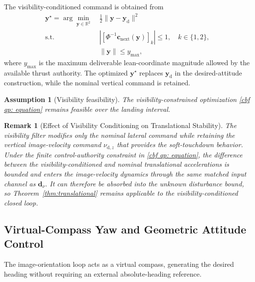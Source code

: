 \documentclass[10pt,conference]{IEEEtran}
\newtheorem{assumption}{Assumption}
\newtheorem{remark}{Remark}
\begin{document}
The visibility-conditioned command is obtained from
\begin{equation}
    \begin{aligned}
    \boldsymbol y^\star = \arg\min_{\boldsymbol y\in\mathbb R^2} ~& \frac{1}{2}\|\boldsymbol y-\boldsymbol y_{\mathrm d}\|^2 \\
    \text{s.t.}\quad& \left| \left[ \Phi^{-1}\boldsymbol c_{\mathrm{next}}(\boldsymbol y) \right]_k \right| \le 1,\quad k\in\{1,2\},\\ 
    &\|\boldsymbol y\|\le y_{\max},
    \end{aligned}
    \label{cbf qp: equation}
\end{equation}
where $y_{\max}$ is the maximum deliverable lean-coordinate magnitude allowed by the available thrust authority.
The optimized $\boldsymbol y^\star$ replaces $\boldsymbol y_{\mathrm d}$ in the desired-attitude construction, while the nominal vertical command is retained.

\begin{assumption}[Visibility feasibility]
\label{asm:visibility_feasibility}
The visibility-constrained optimization \eqref{cbf qp: equation} remains feasible over the landing interval.
\end{assumption}

\begin{remark}[Effect of Visibility Conditioning on Translational Stability]
\label{rem:visibility_stability}
The visibility filter modifies only the nominal lateral command while retaining the vertical image-velocity command $\nu_{\mathrm d,z}$ that provides the soft-touchdown behavior. Under the finite control-authority constraint in \eqref{cbf qp: equation}, the difference between the visibility-conditioned and nominal translational accelerations is bounded and enters the image-velocity dynamics through the same matched input channel as $\boldsymbol d_\nu$. It can therefore be absorbed into the unknown disturbance bound, so Theorem~\ref{thm:translational} remains applicable to the visibility-conditioned closed loop.
\end{remark}

\subsection{Virtual-Compass Yaw and Geometric Attitude Control}
\label{subsec:orientation_control}
The image-orientation loop acts as a virtual compass, generating the desired heading without requiring an external absolute-heading reference.
\end{document}
